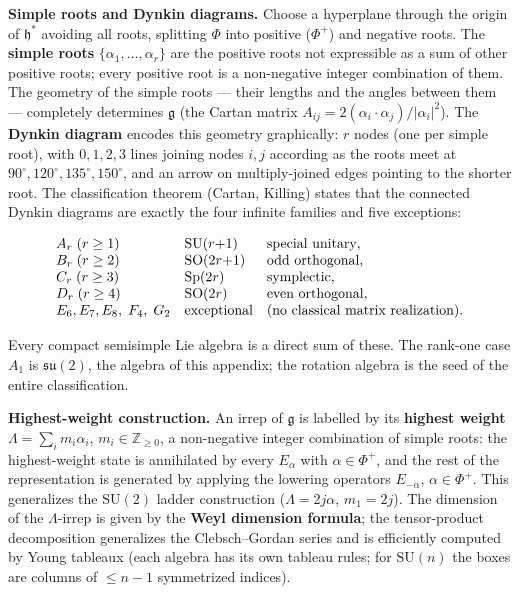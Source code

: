 \medskip\noindent\textbf{Simple roots and Dynkin diagrams.} Choose a hyperplane through the origin of $\mathfrak h^{*}$ avoiding all roots, splitting $\Phi$ into positive ($\Phi^{+}$) and negative roots. The \textbf{simple roots} $\{\alpha_{1},\ldots,\alpha_{r}\}$ are the positive roots not expressible as a sum of other positive roots; every positive root is a non-negative integer combination of them. The geometry of the simple roots --- their lengths and the angles between them --- completely determines $\mathfrak g$ (the Cartan matrix $A_{ij}=2(\alpha_{i}\!\cdot\!\alpha_{j})/|\alpha_{i}|^{2}$). The \textbf{Dynkin diagram} encodes this geometry graphically: $r$ nodes (one per simple root), with $0,1,2,3$ lines joining nodes $i,j$ according as the roots meet at $90^{\circ},120^{\circ},135^{\circ},150^{\circ}$, and an arrow on multiply-joined edges pointing to the shorter root. The classification theorem (Cartan, Killing) states that the connected Dynkin diagrams are exactly the four infinite families and five exceptions:
\begin{linenomath}
\begin{equation}
\begin{array}{l@{\quad}l@{\quad}l}
A_{r}\;(r\ge1) & \mathrm{SU}(r{+}1) & \text{special unitary},\\
B_{r}\;(r\ge2) & \mathrm{SO}(2r{+}1) & \text{odd orthogonal},\\
C_{r}\;(r\ge3) & \mathrm{Sp}(2r) & \text{symplectic},\\
D_{r}\;(r\ge4) & \mathrm{SO}(2r) & \text{even orthogonal},\\
E_{6},E_{7},E_{8},\;F_{4},\;G_{2} & \text{exceptional} & \text{(no classical matrix realization)}.
\end{array}
\label{eq:dynkin-classification}
\end{equation}
\end{linenomath}
Every compact semisimple Lie algebra is a direct sum of these. The rank-one case $A_{1}$ is $\mathfrak{su}(2)$, the algebra of this appendix; the rotation algebra is the seed of the entire classification.

\medskip\noindent\textbf{Highest-weight construction.} An irrep of $\mathfrak g$ is labelled by its \textbf{highest weight} $\Lambda=\sum_{i}m_{i}\alpha_{i}$, $m_{i}\in\mathbb Z_{\ge0}$, a non-negative integer combination of simple roots: the highest-weight state is annihilated by every $E_{\alpha}$ with $\alpha\in\Phi^{+}$, and the rest of the representation is generated by applying the lowering operators $E_{-\alpha}$, $\alpha\in\Phi^{+}$. This generalizes the $\mathrm{SU}(2)$ ladder construction ($\Lambda=2j\alpha$, $m_{1}=2j$). The dimension of the $\Lambda$-irrep is given by the \textbf{Weyl dimension formula}; the tensor-product decomposition generalizes the Clebsch--Gordan series and is efficiently computed by Young tableaux (each algebra has its own tableau rules; for $\mathrm{SU}(n)$ the boxes are columns of $\le n{-}1$ symmetrized indices).

